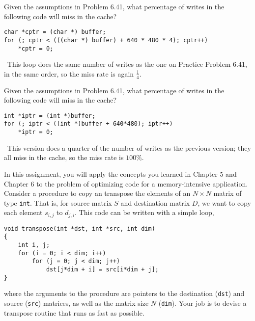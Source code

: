 \documentclass[12pt]{article}
\newenvironment{ex}[2][Exercise]{\begin{trivlist}
		\item[\hskip \labelsep {\bfseries #1}\hskip \labelsep {\bfseries #2.}]}{\end{trivlist}}
\newenvironment{sol}[1][Solution]{\begin{trivlist}
		\item[\hskip \labelsep {\bfseries #1:}]}{\end{trivlist}}
\begin{document}
\begin{ex}{6.42}
	Given the assumptions in Problem 6.41, what percentage of writes in the following code will
	miss in the cache?
	\begin{lstlisting}
char *cptr = (char *) buffer;
for (; cptr < (((char *) buffer) + 640 * 480 * 4); cptr++)
	*cptr = 0;
	\end{lstlisting}
\end{ex}

\begin{sol}
	\
	This loop does the same number of writes as the one on Practice Problem 6.41, in the same order,
	so the miss rate is again $\frac{1}{4}$.
\end{sol}

\begin{ex}{6.43}
	Given the assumptions in Problem 6.41, what percentage of writes in the following code will miss in
	the cache?
	\begin{lstlisting}
int *iptr = (int *)buffer;
for (; iptr < ((int *)buffer + 640*480); iptr++)
	*iptr = 0;
	\end{lstlisting}
\end{ex}

\begin{sol}
	\
	This version does a quarter of the number of writes as the previous version; they all miss in
	the cache, so the miss rate is $100\%$.
\end{sol}

\begin{ex}{6.45}
	In this assignment, you will apply the concepts you learned in Chapter 5 and Chapter 6 to the problem of
	optimizing code for a memory-intensive application. Consider a procedure to copy an transpose the
	elements of an $N\times N$ matrix of type \texttt{int}. That is, for source matrix $S$ and destination
	matrix $D$, we want to copy each element $s_{i,j}$ to $d_{j,i}$. This code can be written with a simple
	loop,
	\begin{lstlisting}
void transpose(int *dst, int *src, int dim)
{
	int i, j;
	for (i = 0; i < dim; i++)
		for (j = 0; j < dim; j++)
			dst[j*dim + i] = src[i*dim + j];
}
	\end{lstlisting}
	where the arguments to the procedure are pointers to the destination (\texttt{dst}) and source
	(\texttt{src}) matrices, as well as the matrix size $N$ (\texttt{dim}). Your job is to devise a transpose
	routine that runs as fast as possible.
\end{ex}
\end{document}
